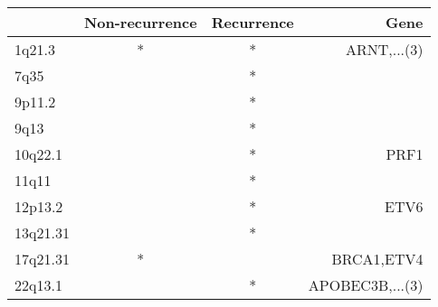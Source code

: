 \begin{tabular}{lccr}
\toprule
{} & Non-recurrence & Recurrence &             Gene \\
\midrule
1q21.3   &              * &          * &      ARNT,...(3) \\
7q35     &                &          * &                  \\
9p11.2   &                &          * &                  \\
9q13     &                &          * &                  \\
10q22.1  &                &          * &             PRF1 \\
11q11    &                &          * &                  \\
12p13.2  &                &          * &             ETV6 \\
13q21.31 &                &          * &                  \\
17q21.31 &              * &            &       BRCA1,ETV4 \\
22q13.1  &                &          * &  APOBEC3B,...(3) \\
\bottomrule
\end{tabular}
